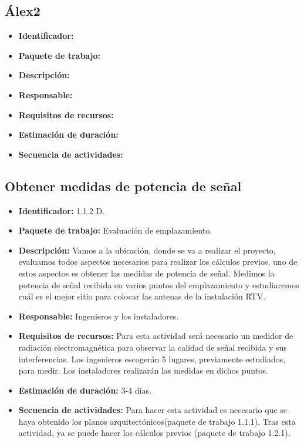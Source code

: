 \subsection{Álex2}
\begin{itemize}
\item \textbf{Identificador: }
\item \textbf{Paquete de trabajo: }
\item \textbf{Descripción: }
\item \textbf{Responsable: }
\item \textbf{Requisitos de recursos: }
\item \textbf{Estimación de duración: }
\item \textbf{Secuencia de actividades: }
\end{itemize}

\subsection{Obtener medidas de potencia de señal}
\begin{itemize}
\item \textbf{Identificador: }1.1.2 D.
\item \textbf{Paquete de trabajo: }Evaluación de emplazamiento.
\item \textbf{Descripción: }Vamos a la ubicación, donde se va a realizar el proyecto, evaluamos todos aspectos necesarios para realizar los cálculos previos, uno de estos aspectos es obtener las medidas de potencia de señal. Medimos la potencia de señal recibida en varios puntos del emplazamiento y estudiaremos cuál es el mejor sitio para colocar las antenas de la instalación RTV.
\item \textbf{Responsable: }Ingenieros y los instaladores.
\item \textbf{Requisitos de recursos: }Para esta actividad será necesario un medidor de radiación electromagnética para observar la calidad de señal recibida y sus interferencias. Los ingenieros escogerán 5 lugares, previamente estudiados, para medir. Los instaladores realizarán las medidas en dichos puntos.
\item \textbf{Estimación de duración: }3-4 días.
\item \textbf{Secuencia de actividades: }Para hacer esta actividad es necesario que se haya obtenido los planos arquitectónicos(paquete de trabajo 1.1.1). Tras esta actividad, ya se puede hacer los cálculos previos (paquete de trabajo 1.2.1).
\end{itemize}

